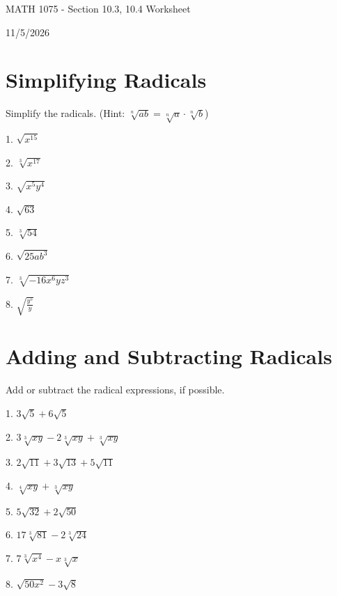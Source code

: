 \documentclass[12pt]{article}
\begin{document}
\begin{center}
    {\LARGE MATH 1075 - Section 10.3, 10.4 Worksheet}

    \vspace{2em}

    {\large 11/5/2026}
\end{center}
\section{Simplifying Radicals}

Simplify the radicals. (Hint: $\sqrt[n]{ab}=\sqrt[n]{a}\cdot\sqrt[n]{b}$) 
\vspace{1.5em}

1. $\sqrt{x^{15}}$

\vspace{4.5em}

2. $\sqrt[3]{x^{17}}$

\vspace{4.5em}

3. $\sqrt{x^{5}y^{4}}$
\vspace{4.5em}

4. $\sqrt{63}$

\vspace{4.5em}

5. $\sqrt[3]{54}$

\vspace{4.5em}

6. $\sqrt{25ab^{3}}$

\vspace{4.5em}

7. $\sqrt[3]{-16x^{6}yz^{3}}$

\vspace{4.5em}

8. $\sqrt{\frac{y^{5}}{y} }$

\vspace{4.5em}
\section{Adding and Subtracting Radicals}

Add or subtract the radical expressions, if possible. 
\vspace{1.5em}

1. $3\sqrt{5}+6\sqrt{5}$

\vspace{4.5em} 

2. $3\sqrt[3]{xy}-2\sqrt[3]{xy}+\sqrt[3]{xy}$

\vspace{4.5em} 

3. $2\sqrt{11}+3\sqrt{13}+5\sqrt{11}$

\vspace{4.5em} 

4. $\sqrt[4]{xy}+\sqrt[3]{xy}$

\vspace{4.5em}

5. $5\sqrt{32}+2\sqrt{50}$

\vspace{4.5em}

6. $17\sqrt[3]{81}-2\sqrt[3]{24}$

\vspace{4.5em}

7. $7\sqrt[3]{x^{4}}-x\sqrt[3]{x}$

\vspace{4.5em}

8. $\sqrt{50x^{2}}-3\sqrt{8}$
\end{document}
